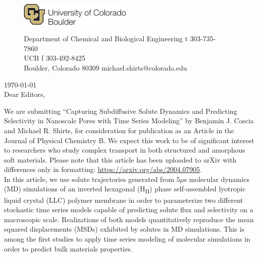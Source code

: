 \documentclass[fontsize=11pt]{article}
\begin{document}
	\graphicspath{{./figures/}}

	\begin{figure}
	\centering
	\begin{minipage}{0.37\textwidth}
	\includegraphics[width=2.14in,left]{CUBoulder.pdf}
	\end{minipage}
	\begin{minipage}{0.62\textwidth}
	\scriptsize
	\noindent Department of Chemical and Biological Engineering \hfill t 303-735-7860~~~~~~~~~~~~~~~~~~ \\
	 UCB \hfill f 303-492-8425~~~~~~~~~~~~~~~~~~ \\
	\noindent Boulder, Colorado 80309 \hfill michael.shirts@colorado.edu \\
	\end{minipage}
	\end{figure}
	
	\noindent \today \\

	\noindent Dear Editors,\\
	
	\newcommand{\ManuscriptTitle}{Capturing Subdiffusive Solute Dynamics and 
	Predicting Selectivity in Nanoscale Pores with Time Series Modeling}
	
	We are submitting ``\ManuscriptTitle'' by Benjamin J. Coscia and Michael R.
	Shirts, for consideration for publication as an Article in the Journal of 
	Physical Chemistry B. We expect this work to be of significant interest to 
	researchers who study complex transport in both structured and amorphous 
	soft materials. Please note that this article has been uploaded to arXiv with
	differences only in formatting: \href{https://arxiv.org/abs/2004.07905}{https://arxiv.org/abs/2004.07905}. \\
	
	In this article, we use solute trajectories generated from 5$\mu$s molecular
	dynamics (MD) simulations of an inverted hexagonal (H\textsubscript{II}) phase
	self-assembled lyotropic liquid crystal (LLC) polymer membrane in order to 
	parameterize two different stochastic time series models capable of predicting
	solute flux and selectivity on a macroscopic scale. Realizations of both models
	quantitatively reproduce the mean squared displacements (MSDs) exhibited by 
	solutes in MD simulations. This is among the first studies to apply time 
	series modeling of molecular simulations in order to predict bulk materials properties.\\
\end{document}
